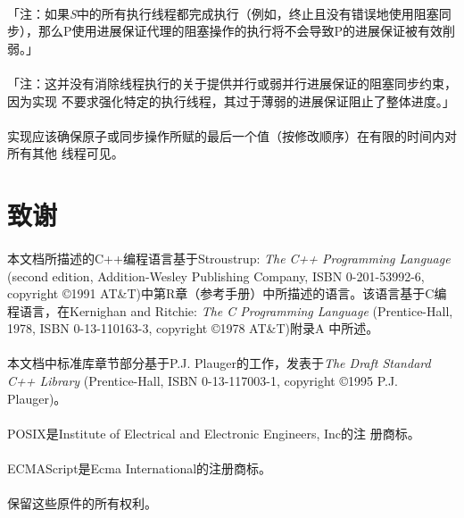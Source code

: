 \paragraph{}
「注：如果\textit{S}中的所有执行线程都完成执行（例如，终止且没有错误地使用阻塞同
步），那么P使用进展保证代理的阻塞操作的执行将不会导致P的进展保证被有效削弱。」

\paragraph{}
「注：这并没有消除线程执行的关于提供并行或弱并行进展保证的阻塞同步约束，因为实现
不要求强化特定的执行线程，其过于薄弱的进展保证阻止了整体进度。」

\paragraph{}
实现应该确保原子或同步操作所赋的最后一个值（按修改顺序）在有限的时间内对所有其他
线程可见。

\section{致谢}
\paragraph{}
本文档所描述的C++编程语言基于Stroustrup: \textit{The C++ Programming Language}
(second edition, Addition-Wesley Publishing Company, ISBN 0-201-53992-6,
copyright \copyright 1991 AT\&T)中第R章（参考手册）中所描述的语言。该语言基于C编
程语言，在Kernighan and Ritchie: \textit{The C Programming Language}
(Prentice-Hall, 1978, ISBN 0-13-110163-3, copyright \copyright 1978 AT\&T)附录A
中所述。

\paragraph{}
本文档中标准库章节部分基于P.J. Plauger的工作，发表于\textit{The Draft Standard
C++ Library} (Prentice-Hall, ISBN 0-13-117003-1, copyright \copyright 1995 P.J.
Plauger)。

\paragraph{}
POSIX\textregistered 是Institute of Electrical and Electronic Engineers, Inc的注
册商标。

\paragraph{}
ECMAScript\textregistered 是Ecma International的注册商标。

\paragraph{}
保留这些原件的所有权利。
